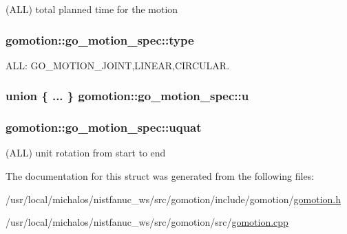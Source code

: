 (A\-L\-L) total planned time for the motion 

\hypertarget{structgomotion_1_1go__motion__spec_a186231a66a1f1f6d6628cd23baf60530}{
\subsubsection[{type}]{ gomotion\-::go\-\_\-motion\-\_\-spec\-::type}}\label{structgomotion_1_1go__motion__spec_a186231a66a1f1f6d6628cd23baf60530}


A\-L\-L\-: G\-O\-\_\-\-M\-O\-T\-I\-O\-N\-\_\-\-J\-O\-I\-N\-T,L\-I\-N\-E\-A\-R,C\-I\-R\-C\-U\-L\-A\-R. 

\hypertarget{structgomotion_1_1go__motion__spec_a68cb712eaf58a3aeb5f99d11cdbef5eb}{
\subsubsection[{u}]{\setlength{\rightskip}{0pt plus 5cm}union \{ ... \}   gomotion\-::go\-\_\-motion\-\_\-spec\-::u}}\label{structgomotion_1_1go__motion__spec_a68cb712eaf58a3aeb5f99d11cdbef5eb}
\hypertarget{structgomotion_1_1go__motion__spec_af21779ad35fe55e85d91bf8e133def52}{
\subsubsection[{uquat}]{ gomotion\-::go\-\_\-motion\-\_\-spec\-::uquat}}\label{structgomotion_1_1go__motion__spec_af21779ad35fe55e85d91bf8e133def52}


(A\-L\-L) unit rotation from start to end 



The documentation for this struct was generated from the following files\-:\begin{DoxyCompactItemize}
\item 
/usr/local/michalos/nistfanuc\-\_\-ws/src/gomotion/include/gomotion/\hyperlink{gomotion_8h}{gomotion.\-h}\item 
/usr/local/michalos/nistfanuc\-\_\-ws/src/gomotion/src/\hyperlink{gomotion_8cpp}{gomotion.\-cpp}\end{DoxyCompactItemize}
